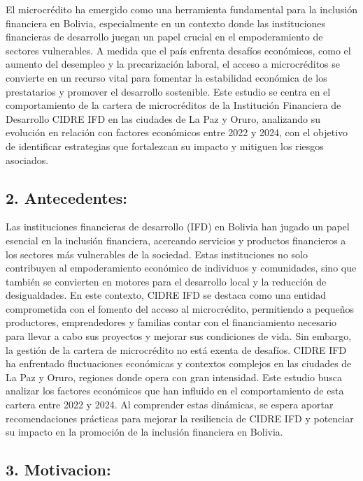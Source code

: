 \documentclass[Royal,times,sageh]{sagej}
\begin{document}
El microcrédito ha emergido como una herramienta fundamental para la
inclusión financiera en Bolivia, especialmente en un contexto donde las
instituciones financieras de desarrollo juegan un papel crucial en el
empoderamiento de sectores vulnerables. A medida que el país enfrenta
desafíos económicos, como el aumento del desempleo y la precarización
laboral, el acceso a microcréditos se convierte en un recurso vital para
fomentar la estabilidad económica de los prestatarios y promover el
desarrollo sostenible. Este estudio se centra en el comportamiento de la
cartera de microcréditos de la Institución Financiera de Desarrollo
CIDRE IFD en las ciudades de La Paz y Oruro, analizando su evolución en
relación con factores económicos entre 2022 y 2024, con el objetivo de
identificar estrategias que fortalezcan su impacto y mitiguen los
riesgos asociados.

\subsection{\texorpdfstring{2.
\textbf{Antecedentes:}}{2. Antecedentes:}}\label{antecedentes}

Las instituciones financieras de desarrollo (IFD) en Bolivia han jugado
un papel esencial en la inclusión financiera, acercando servicios y
productos financieros a los sectores más vulnerables de la sociedad.
Estas instituciones no solo contribuyen al empoderamiento económico de
individuos y comunidades, sino que también se convierten en motores para
el desarrollo local y la reducción de desigualdades. En este contexto,
CIDRE IFD se destaca como una entidad comprometida con el fomento del
acceso al microcrédito, permitiendo a pequeños productores,
emprendedores y familias contar con el financiamiento necesario para
llevar a cabo sus proyectos y mejorar sus condiciones de vida. Sin
embargo, la gestión de la cartera de microcrédito no está exenta de
desafíos. CIDRE IFD ha enfrentado fluctuaciones económicas y contextos
complejos en las ciudades de La Paz y Oruro, regiones donde opera con
gran intensidad. Este estudio busca analizar los factores económicos que
han influido en el comportamiento de esta cartera entre 2022 y 2024. Al
comprender estas dinámicas, se espera aportar recomendaciones prácticas
para mejorar la resiliencia de CIDRE IFD y potenciar su impacto en la
promoción de la inclusión financiera en Bolivia.

\subsection{\texorpdfstring{3.
\textbf{Motivacion:}}{3. Motivacion:}}\label{motivacion}
\end{document}
